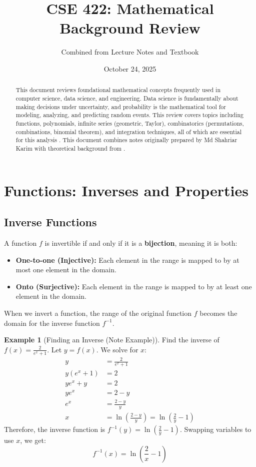 \documentclass[11pt, a4paper]{article}
\title{CSE 422: Mathematical Background Review}
\author{Combined from Lecture Notes and Textbook}
\date{October 24, 2025}
\theoremstyle{definition}
\newtheorem{example}[theorem]{Example}
\begin{document}
\maketitle

\begin{abstract}
    This document reviews foundational mathematical concepts frequently used in computer science, data science, and engineering. Data science is fundamentally about making decisions under uncertainty, and probability is the mathematical tool for modeling, analyzing, and predicting random events. This review covers topics including functions, polynomials, infinite series (geometric, Taylor), combinatorics (permutations, combinations, binomial theorem), and integration techniques, all of which are essential for this analysis \cite{Chan2021}. This document combines notes originally prepared by Md Shahriar Karim \cite{KarimCSE422} with theoretical background from \cite{Chan2021}.
\end{abstract}

\tableofcontents

\newpage

\section{Functions: Inverses and Properties}

\subsection{Inverse Functions}
A function $f$ is invertible if and only if it is a \textbf{bijection}, meaning it is both:
\begin{itemize}
    \item \textbf{One-to-one (Injective):} Each element in the range is mapped to by at most one element in the domain.
    \item \textbf{Onto (Surjective):} Each element in the range is mapped to by at least one element in the domain.
\end{itemize}
When we invert a function, the range of the original function $f$ becomes the domain for the inverse function $f^{-1}$.

\begin{example}[Finding an Inverse (Note Example)]
Find the inverse of $f(x) = \frac{2}{e^x + 1}$.
Let $y = f(x)$. We solve for $x$:
\begin{align*}
    y &= \frac{2}{e^x + 1} \\
    y(e^x + 1) &= 2 \\
    ye^x + y &= 2 \\
    ye^x &= 2 - y \\
    e^x &= \frac{2-y}{y} \\
    x &= \ln\left(\frac{2-y}{y}\right) = \ln\left(\frac{2}{y} - 1\right)
\end{align*}
Therefore, the inverse function is $f^{-1}(y) = \ln\left(\frac{2}{y} - 1\right)$. Swapping variables to use $x$, we get:
\[
f^{-1}(x) = \ln\left(\frac{2}{x} - 1\right)
\]
\end{example}
\end{document}
